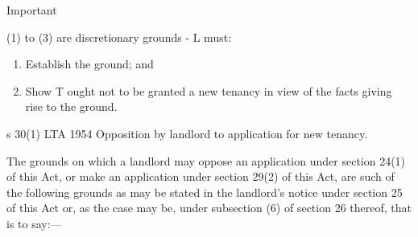 \documentclass[
]{article}
\providecommand{\tightlist}{%
  \setlength{\itemsep}{0pt}\setlength{\parskip}{0pt}}
\newenvironment{env-2aad614f-6fd6-4025-876c-fcdbeae766fb}
{
    \savenotes\tcolorbox[blanker,breakable,left=5pt,borderline west={2pt}{-4pt}{green}]
}
{
    \endtcolorbox\spewnotes
}
\newenvironment{env-4361be9f-9a08-465c-86d1-6b024e2d00e2}
{
    \savenotes\tcolorbox[blanker,breakable,left=5pt,borderline west={2pt}{-4pt}{cyan}]
}
{
    \endtcolorbox\spewnotes
}
\begin{document}
\begin{env-4361be9f-9a08-465c-86d1-6b024e2d00e2}

Important

(1) to (3) are discretionary grounds - L must:

\begin{enumerate}
\tightlist
\item
  Establish the ground; and
\item
  Show T ought not to be granted a new tenancy in view of the facts
  giving rise to the ground.
\end{enumerate}

\end{env-4361be9f-9a08-465c-86d1-6b024e2d00e2}

\begin{env-2aad614f-6fd6-4025-876c-fcdbeae766fb}

s 30(1) LTA 1954 Opposition by landlord to application for new tenancy.

The grounds on which a landlord may oppose an application under section
24(1) of this Act, or make an application under section 29(2) of this
Act, are such of the following grounds as may be stated in the
landlord's notice under section 25 of this Act or, as the case may be,
under subsection (6) of section 26 thereof, that is to say:---


\end{env-2aad614f-6fd6-4025-876c-fcdbeae766fb}
\end{document}
